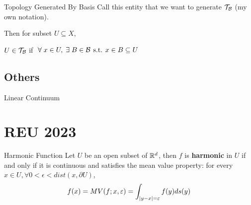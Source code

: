 \documentclass[a4paper, 10pt]{article}
\begin{document}
\begin{definition} {Topology Generated By Basis}
    Call this entity that we want to generate \(\mathcal{T}_{\mathcal{B}}\) (my own notation).

    Then for subset \(U \subseteq X\), 
    \begin{center}
        \( U \in \mathcal{T}_{\mathcal{B}}\) if \(\forall x \in U, \exists B \in \calb \st x \in B \subseteq U\)
    \end{center}
\end{definition}

\subsection{Others}
\begin{definition} {Linear Continuum}

\end{definition}


\section{REU 2023}
\begin{definition} {Harmonic Function}
Let \(U\) be an open subset of \(\mathbb{R}^d\), then \(f\) is \textbf{harmonic} in \(U\) if and only if it is continuous and satisfies the mean value property: for every \(x \in U, \forall 0 < \epsilon < dist(x, \partial U)\),
\[
f(x) = MV(f; x, \varepsilon) = \int_{\lvert y-x\rvert = \varepsilon} f(y) ds(y)
\]
\end{definition}
\end{document}
